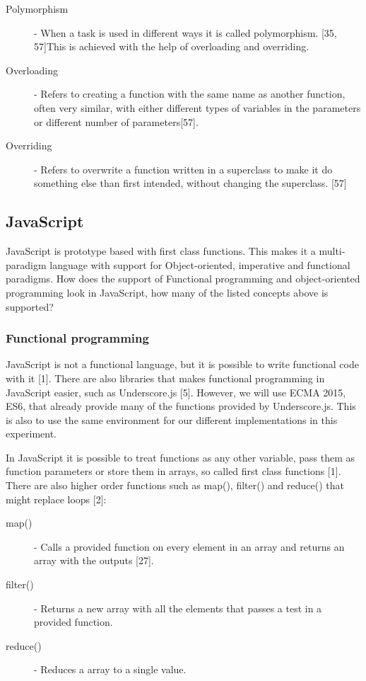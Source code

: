 \documentclass {article}
\begin{document}
\begin{description}
\item [Polymorphism] - When a task is used in different ways it is called polymorphism. [35, 57]This is achieved with the help of overloading and overriding.

\item[Overloading] - Refers to creating a function with the same name as another function, often very similar, with either different types of variables in the parameters or different number of parameters[57].

\item[Overriding] - Refers to overwrite a function written in a superclass to make it do something else than first intended, without changing the superclass. [57]
\end{description}
\subsection{JavaScript}
JavaScript is prototype based with first class functions. This makes it a multi-paradigm language with support for Object-oriented, imperative and functional paradigms. How does the support of Functional programming and object-oriented programming look in JavaScript, how many of the listed concepts above is supported?
\subsubsection{Functional programming}
JavaScript is not a functional language, but it is possible to write functional code with it [1]. There are also libraries that makes functional programming in JavaScript easier, such as Underscore.js [5]. However, we will use ECMA 2015, ES6, that already provide many of the functions provided by Underscore.js. This is also to use the same environment for our different implementations in this experiment.

In JavaScript it is possible to treat functions as any other variable, pass them as function parameters or store them in arrays, so called first class functions [1]. There are also higher order functions such as map(), filter() and reduce() that might replace loops [2]:

\begin{description}
\item [map()] - Calls a provided function on every element in an array and returns an array with the outputs [27].
\item [filter()] - Returns a new array with all the elements that passes a test in a provided function. 
\item [reduce()] - Reduces a array to a single value.
\end{description}
\end{document}
